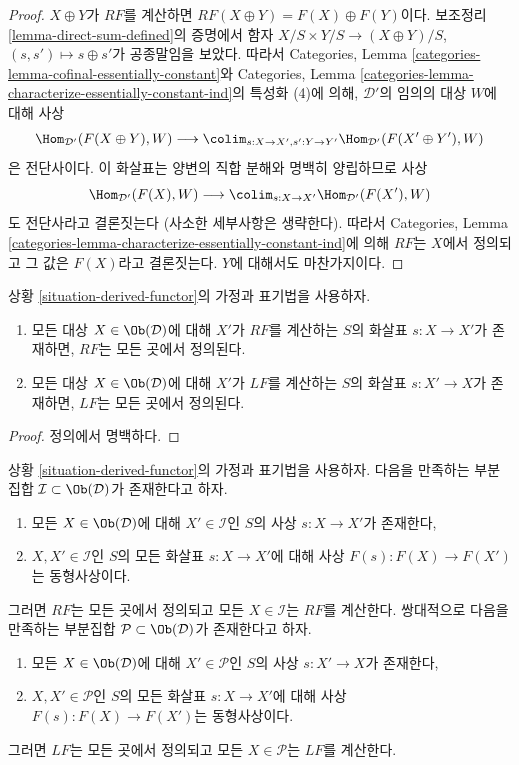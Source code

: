 \begin{proof}
$X \oplus Y$가 $RF$를 계산하면
$RF(X \oplus Y) = F(X) \oplus F(Y)$이다.
보조정리 \ref{lemma-direct-sum-defined}의 증명에서 함자
$X/S \times Y/S \to (X \oplus Y)/S$, $(s, s') \mapsto s \oplus s'$가
공종말임을 보았다. 따라서 Categories, Lemma
\ref{categories-lemma-cofinal-essentially-constant}와 Categories, Lemma
\ref{categories-lemma-characterize-essentially-constant-ind}의
특성화 (4)에 의해, $\mathcal{D}'$의 임의의 대상 $W$에 대해 사상
$$
\Hom_{\mathcal{D}'}(F(X \oplus Y), W)
\longrightarrow
\colim_{s : X \to X', s' : Y \to Y'} \Hom_{\mathcal{D}'}(F(X' \oplus Y'), W)
$$
은 전단사이다. 이 화살표는 양변의 직합 분해와 명백히 양립하므로 사상
$$
\Hom_{\mathcal{D}'}(F(X), W)
\longrightarrow
\colim_{s : X \to X'} \Hom_{\mathcal{D}'}(F(X'), W)
$$
도 전단사라고 결론짓는다 (사소한 세부사항은 생략한다).
따라서 Categories, Lemma
\ref{categories-lemma-characterize-essentially-constant-ind}에 의해
$RF$는 $X$에서 정의되고 그 값은 $F(X)$라고 결론짓는다.
$Y$에 대해서도 마찬가지이다.
\end{proof}

\begin{lemma}
\label{lemma-existence-computes}
상황 \ref{situation-derived-functor}의 가정과 표기법을 사용하자.
\begin{enumerate}
\item 모든 대상 $X \in \Ob(\mathcal{D})$에 대해 $X'$가 $RF$를 계산하는
$S$의 화살표 $s : X \to X'$가 존재하면, $RF$는 모든 곳에서 정의된다.
\item 모든 대상 $X \in \Ob(\mathcal{D})$에 대해 $X'$가 $LF$를 계산하는
$S$의 화살표 $s : X' \to X$가 존재하면, $LF$는 모든 곳에서 정의된다.
\end{enumerate}
\end{lemma}

\begin{proof}
정의에서 명백하다.
\end{proof}
\begin{lemma}
\label{lemma-find-existence-computes}
상황 \ref{situation-derived-functor}의 가정과 표기법을 사용하자.
다음을 만족하는 부분집합 $\mathcal{I} \subset \Ob(\mathcal{D})$가 존재한다고
하자.
\begin{enumerate}
\item 모든 $X \in \Ob(\mathcal{D})$에 대해 $X' \in \mathcal{I}$인
$S$의 사상 $s : X \to X'$가 존재한다,
\item $X, X' \in \mathcal{I}$인 $S$의 모든 화살표
$s : X \to X'$에 대해 사상 $F(s) : F(X) \to F(X')$는 동형사상이다.
\end{enumerate}
그러면 $RF$는 모든 곳에서 정의되고 모든 $X \in \mathcal{I}$는
$RF$를 계산한다. 쌍대적으로 다음을 만족하는 부분집합
$\mathcal{P} \subset \Ob(\mathcal{D})$가 존재한다고 하자.
\begin{enumerate}
\item 모든 $X \in \Ob(\mathcal{D})$에 대해 $X' \in \mathcal{P}$인
$S$의 사상 $s : X' \to X$가 존재한다,
\item $X, X' \in \mathcal{P}$인 $S$의 모든 화살표
$s : X \to X'$에 대해 사상 $F(s) : F(X) \to F(X')$는 동형사상이다.
\end{enumerate}
그러면 $LF$는 모든 곳에서 정의되고 모든 $X \in \mathcal{P}$는
$LF$를 계산한다.
\end{lemma}

